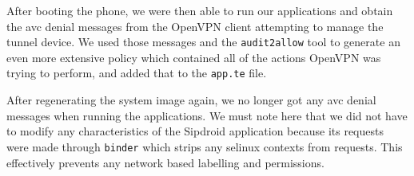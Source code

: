 After booting the phone, we were then able to run our applications and obtain the \ac{avc} denial messages from the OpenVPN client attempting to manage the tunnel device.
We used those messages and the \verb=audit2allow= tool to generate an even more extensive policy which contained all of the actions OpenVPN was trying to perform, and added that to the \verb=app.te= file.

After regenerating the system image again, we no longer got any \ac{avc} denial messages when running the applications.
We must note here that we did not have to modify any characteristics of the Sipdroid application because its requests were made through \verb=binder= which strips any \ac{selinux} contexts from requests.
This effectively prevents any network based labelling and permissions.

